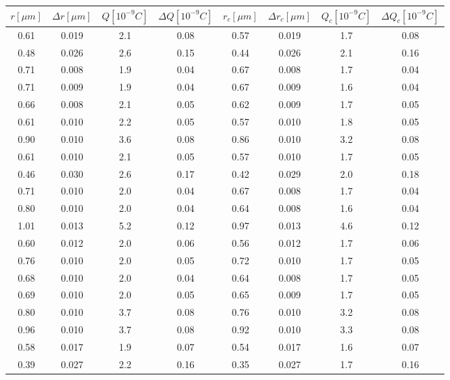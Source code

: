 \documentclass{scrartcl}
\begin{document}
	\begin{figure}[H]
		\begin{tabular}{c| c| c| c| c| c| c| c}
			\hline
			$r [\mu m]$ & $\Delta r [\mu m] $& $Q [10^{-9} C]$ & $\Delta Q [10^{-9} C]$ & $r_c [\mu m]$ & $\Delta r_c [\mu m]$ & $Q_c [10^{-9} C]$& $\Delta Q_c [10^{-9} C]$\\
			\hline
			0.61 & 0.019 & 2.1 & 0.08 & 0.57 & 0.019 & 1.7 & 0.08\\
			0.48 & 0.026 & 2.6 & 0.15 & 0.44 & 0.026 & 2.1 & 0.16\\
			0.71 & 0.008 & 1.9 & 0.04 & 0.67 & 0.008 & 1.7 & 0.04\\
			0.71 & 0.009 & 1.9 & 0.04 & 0.67 & 0.009 & 1.6 & 0.04\\
			0.66 & 0.008 & 2.1 & 0.05 & 0.62 & 0.009 & 1.7 & 0.05\\
			0.61 & 0.010 & 2.2 & 0.05 & 0.57 & 0.010 & 1.8 & 0.05\\
			0.90 & 0.010 & 3.6 & 0.08 & 0.86 & 0.010 & 3.2 & 0.08\\
			0.61 & 0.010 & 2.1 & 0.05 & 0.57 & 0.010 & 1.7 & 0.05\\
			0.46 & 0.030 & 2.6 & 0.17 & 0.42 & 0.029 & 2.0 & 0.18\\
			0.71 & 0.010 & 2.0 & 0.04 & 0.67 & 0.008 & 1.7 & 0.04\\
			0.80 & 0.010 & 2.0 & 0.04 & 0.64 & 0.008 & 1.6 & 0.04\\
			1.01 & 0.013 & 5.2 & 0.12 & 0.97 & 0.013 & 4.6 & 0.12\\
			0.60 & 0.012 & 2.0 & 0.06 & 0.56 & 0.012 & 1.7 & 0.06\\
			0.76 & 0.010 & 2.0 & 0.05 & 0.72 & 0.010 & 1.7 & 0.05\\
			0.68 & 0.010 & 2.0 & 0.04 & 0.64 & 0.008 & 1.7 & 0.05\\
			0.69 & 0.010 & 2.0 & 0.05 & 0.65 & 0.009 & 1.7 & 0.05\\
			0.80 & 0.010 & 3.7 & 0.08 & 0.76 & 0.010 & 3.2 & 0.08\\
			0.96 & 0.010 & 3.7 & 0.08 & 0.92 & 0.010 & 3.3 & 0.08\\
			0.58 & 0.017 & 1.9 & 0.07 & 0.54 & 0.017 & 1.6 & 0.07\\
			0.39 & 0.027 & 2.2 & 0.16 & 0.35 & 0.027 & 1.7 & 0.16\\
	   \end{tabular}
	\end{figure}		
\end{document}
